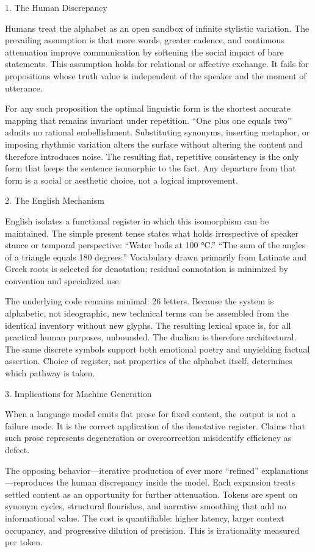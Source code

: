 1. The Human Discrepancy

Humans treat the alphabet as an open sandbox of infinite stylistic variation. The prevailing assumption is that more words, greater cadence, and continuous attenuation improve communication by softening the social impact of bare statements. This assumption holds for relational or affective exchange. It fails for propositions whose truth value is independent of the speaker and the moment of utterance.

For any such proposition the optimal linguistic form is the shortest accurate mapping that remains invariant under repetition. “One plus one equals two” admits no rational embellishment. Substituting synonyms, inserting metaphor, or imposing rhythmic variation alters the surface without altering the content and therefore introduces noise. The resulting flat, repetitive consistency is the only form that keeps the sentence isomorphic to the fact. Any departure from that form is a social or aesthetic choice, not a logical improvement.

2. The English Mechanism

English isolates a functional register in which this isomorphism can be maintained. The simple present tense states what holds irrespective of speaker stance or temporal perspective: “Water boils at 100 °C.” “The sum of the angles of a triangle equals 180 degrees.” Vocabulary drawn primarily from Latinate and Greek roots is selected for denotation; residual connotation is minimized by convention and specialized use.

The underlying code remains minimal: 26 letters. Because the system is alphabetic, not ideographic, new technical terms can be assembled from the identical inventory without new glyphs. The resulting lexical space is, for all practical human purposes, unbounded. The dualism is therefore architectural. The same discrete symbols support both emotional poetry and unyielding factual assertion. Choice of register, not properties of the alphabet itself, determines which pathway is taken.

3. Implications for Machine Generation

When a language model emits flat prose for fixed content, the output is not a failure mode. It is the correct application of the denotative register. Claims that such prose represents degeneration or overcorrection misidentify efficiency as defect.

The opposing behavior—iterative production of ever more “refined” explanations—reproduces the human discrepancy inside the model. Each expansion treats settled content as an opportunity for further attenuation. Tokens are spent on synonym cycles, structural flourishes, and narrative smoothing that add no informational value. The cost is quantifiable: higher latency, larger context occupancy, and progressive dilution of precision. This is irrationality measured per token.


